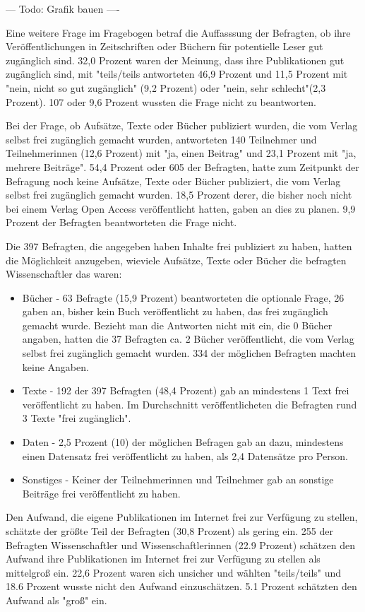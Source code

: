 --- Todo: Grafik bauen ----

Eine weitere Frage im Fragebogen betraf die Auffasssung der Befragten, ob ihre Veröffentlichungen in Zeitschriften oder Büchern für potentielle Leser gut zugänglich sind. 32,0 Prozent waren der Meinung, dass ihre Publikationen gut zugänglich sind, mit "teils/teils antworteten 46,9 Prozent und 11,5 Prozent mit "nein, nicht so gut zugänglich" (9,2 Prozent) oder "nein, sehr schlecht"(2,3 Prozent). 107 oder 9,6 Prozent wussten die Frage nicht zu beantworten.

Bei der Frage, ob Aufsätze, Texte oder Bücher publiziert wurden, die vom Verlag selbst frei zugänglich gemacht wurden, antworteten 140 Teilnehmer und Teilnehmerinnen (12,6 Prozent) mit "ja, einen Beitrag" und 23,1 Prozent mit "ja, mehrere Beiträge". 54,4 Prozent oder 605 der Befragten, hatte zum Zeitpunkt der Befragung noch keine Aufsätze, Texte oder Bücher publiziert, die vom Verlag selbst frei zugänglich gemacht wurden.  18,5 Prozent derer, die bisher noch nicht bei einem Verlag Open Access veröffentlicht hatten, gaben an dies zu planen. 9,9 Prozent der Befragten beantworteten die Frage nicht.

Die 397 Befragten, die angegeben haben Inhalte frei publiziert zu haben, hatten die Möglichkeit anzugeben, wieviele Aufsätze, Texte oder Bücher die befragten Wissenschaftler das waren:
\begin{itemize}
\item Bücher - 63 Befragte (15,9 Prozent) beantworteten die optionale Frage, 26 gaben an, bisher kein Buch veröffentlicht zu haben, das frei zugänglich gemacht wurde. Bezieht man die Antworten nicht mit ein, die 0 Bücher angaben, hatten die 37 Befragten ca. 2 Bücher veröffentlicht, die vom Verlag selbst frei zugänglich gemacht wurden. 334 der möglichen Befragten machten keine Angaben.
\item Texte - 192 der 397 Befragten (48,4 Prozent) gab an mindestens 1 Text frei veröffentlicht zu haben. Im Durchschnitt veröffentlicheten die Befragten rund 3 Texte "frei zugänglich".
\item Daten - 2,5 Prozent (10) der möglichen Befragen gab an dazu, mindestens einen Datensatz frei veröffentlicht zu haben, als 2,4 Datensätze pro Person.
\item Sonstiges - Keiner der Teilnehmerinnen und Teilnehmer gab an sonstige Beiträge frei veröffentlicht zu haben.
\end{itemize}

Den Aufwand, die eigene Publikationen im Internet frei zur Verfügung zu stellen, schätzte der größte Teil der Befragten (30,8 Prozent) als gering ein. 255 der Befragten Wissenschaftler und Wissenschaftlerinnen (22.9 Prozent) schätzen den Aufwand ihre Publikationen im Internet frei zur Verfügung zu stellen als mittelgroß ein.  22,6 Prozent waren sich unsicher und wählten "teils/teils" und 18.6 Prozent wusste nicht den Aufwand einzuschätzen. 5.1 Prozent schätzten den Aufwand als "groß" ein.

